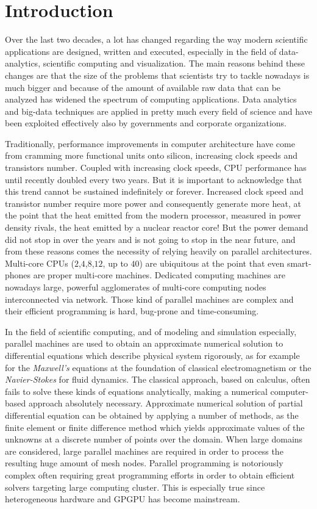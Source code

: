\chapter{Introduction}


Over the last two decades, a lot has changed regarding the way modern scientific applications are designed, written and executed, especially in the field of data-analytics, scientific computing and visualization. The main reasons behind these changes are that the size of the problems that scientists try to tackle nowadays is much bigger and because of the amount of available raw data that can be analyzed has widened the spectrum of computing applications. Data analytics and big-data techniques are applied in pretty much every field of science and have been exploited effectively also by governments and corporate organizations.

Traditionally, performance improvements in computer architecture have come from cramming more functional units onto silicon, increasing clock speeds and transistors number. Coupled with increasing clock speeds, CPU performance has until recently doubled every two years.  But it is important to acknowledge that this trend cannot be sustained indefinitely or forever. Increased clock speed and transistor number require more power and consequently generate more heat, at the point that the heat emitted from the modern processor, measured in power density rivals, the heat emitted by a nuclear reactor core!
But the power demand did not stop in over the years and is not going to stop in the near future,  and from these reasons comes the necessity of relying heavily on parallel architectures. Multi-core CPUs ($2$,$4$,$8$,$12$, up to $40$)  are ubiquitous at the point that even smart-phones are proper multi-core machines. Dedicated computing machines are nowadays large, powerful agglomerates of multi-core computing nodes interconnected via  network. Those kind of parallel machines are complex and their efficient programming is hard, bug-prone and time-consuming. 

In the field of scientific computing, and of modeling and simulation especially, parallel machines are used to obtain an approximate numerical solution to differential equations which describe physical system rigorously, as for example for the \textit{Maxwell's} equations at the foundation of classical electromagnetism or the \textit{Navier-Stokes} for fluid dynamics.
The classical approach, based on calculus, often fails to solve these kinds of equations analytically, making a numerical computer-based approach absolutely necessary.
Approximate numerical solution of partial differential equation can be obtained by applying a number of methods, as the finite element or finite difference method which yields approximate values of the unknowns at a discrete number of points over the domain.
When large domains are considered, large parallel machines are required in order to process the resulting huge amount of mesh nodes. Parallel programming is notoriously complex often requiring great programming efforts in order to obtain efficient solvers targeting large computing cluster. This is especially true since heterogeneous hardware and GPGPU has become mainstream.

